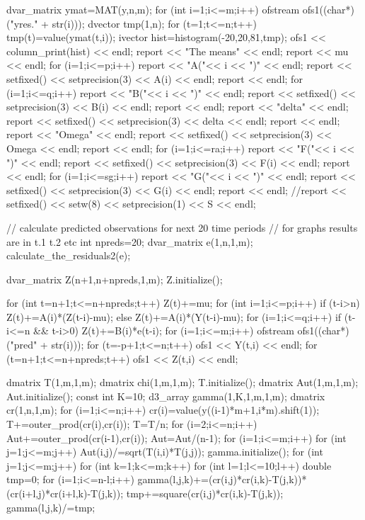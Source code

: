   {
    dvar_matrix ymat=MAT(y,n,m);
    for (int i=1;i<=m;i++) {
       ofstream ofs1((char*)("yres." + str(i)));
       dvector tmp(1,n);
       for (t=1;t<=n;t++) 
         tmp(t)=value(ymat(t,i));
       ivector hist=histogram(-20,20,81,tmp);	 
         ofs1 << column_print(hist) << endl;
    }  
  }   
  report << "The means" << endl;
  report << mu << endl;
  for (i=1;i<=p;i++) {
    report  << "A("<< i << ")" << endl;
    report << setfixed() << setprecision(3) << A(i) << endl;
  }  
  report << endl;
  for (i=1;i<=q;i++) {
    report  << "B("<< i << ")" << endl;
    report << setfixed() << setprecision(3) << B(i) << endl;
  }  
  report << endl;
  report  << "delta" << endl;
  report << setfixed() << setprecision(3) << delta << endl;
  report << endl;
  report  << "Omega" << endl;
  report << setfixed() << setprecision(3) << Omega << endl;
  report << endl;
  for (i=1;i<=ra;i++) {
    report  << "F("<< i << ")" << endl;
    report << setfixed() << setprecision(3) << F(i) << endl;
  }  
  report << endl;
  for (i=1;i<=sg;i++) {
    report  << "G("<< i << ")" << endl;
    report << setfixed() << setprecision(3) << G(i) << endl;
  }  
  report << endl;
  //report << setfixed() << setw(8) << setprecision(1) << S << endl;
  {  // calculate predicted observations for next 20 time periods
     // for graphs  results are in t.1 t.2 etc
     int npreds=20;
     dvar_matrix e(1,n,1,m);
     calculate_the_residuals2(e);
   
     dvar_matrix Z(n+1,n+npreds,1,m);
     Z.initialize();
   
     for (int t=n+1;t<=n+npreds;t++) {
       Z(t)+=mu;
       for (int i=1;i<=p;i++) {
         if (t-i>n)
           Z(t)+=A(i)*(Z(t-i)-mu); 
         else 
           Z(t)+=A(i)*(Y(t-i)-mu); 
       }
       for (i=1;i<=q;i++) {
         if (t-i<=n && t-i>0)
           Z(t)+=B(i)*e(t-i); 
       }	   
     }  	 
     for (i=1;i<=m;i++) {
       ofstream ofs1((char*)("pred" + str(i)));
       for (t=-p+1;t<=n;t++) 
         ofs1 << Y(t,i) << endl;
       for (t=n+1;t<=n+npreds;t++) 
         ofs1 << Z(t,i) << endl;
     }  
   }  
   dmatrix T(1,m,1,m);
   dmatrix chi(1,m,1,m);
   T.initialize();
   dmatrix Aut(1,m,1,m);
   Aut.initialize();
   const int K=10;
   d3_array gamma(1,K,1,m,1,m);
   dmatrix cr(1,n,1,m);
   for (i=1;i<=n;i++)
   {
     cr(i)=value(y((i-1)*m+1,i*m).shift(1));
     T+=outer_prod(cr(i),cr(i));
   }
   T=T/n;
   for (i=2;i<=n;i++)
   {
     Aut+=outer_prod(cr(i-1),cr(i));
   }
   Aut=Aut/(n-1);
   for (i=1;i<=m;i++)
   {
     for (int j=1;j<=m;j++)
     {
       Aut(i,j)/=sqrt(T(i,i)*T(j,j));
     }
   }
   gamma.initialize();
   for (int j=1;j<=m;j++)
   {
     for (int k=1;k<=m;k++)
     {
       for (int l=1;l<=10;l++)
       {
         double tmp=0;
         for (i=1;i<=n-l;i++)
         {
           gamma(l,j,k)+=(cr(i,j)*cr(i,k)-T(j,k))*(cr(i+l,j)*cr(i+l,k)-T(j,k));
           tmp+=square(cr(i,j)*cr(i,k)-T(j,k));
         }
         gamma(l,j,k)/=tmp;
       }
     }
   }
 
